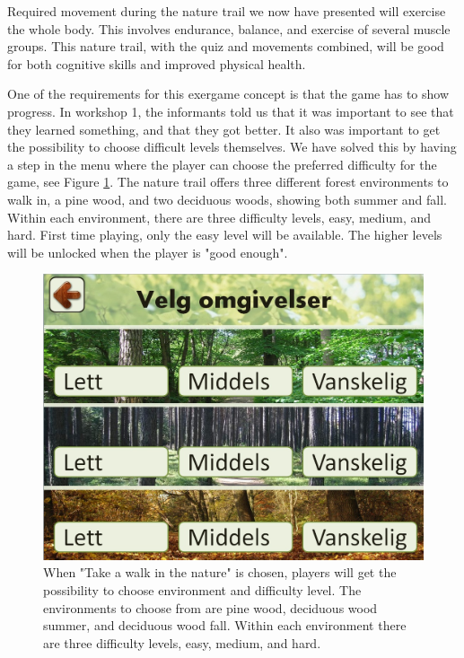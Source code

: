 Required movement during the nature trail we now have presented will exercise the whole body. This involves endurance, balance, and exercise of several muscle groups. This nature trail, with the quiz and movements combined, will be good for both cognitive skills and improved physical health.  

One of the requirements for this exergame concept is that the game has to show progress. In workshop 1, the informants told us that it was important to see that they learned something, and that they got better. It also was important to get the possibility to choose difficult levels themselves. We have solved this by having a step in the menu where the player can choose the preferred difficulty for the game, see Figure \ref{fig:omgivelseNivaa}. The nature trail offers three different forest environments to walk in, a pine wood, and two deciduous woods, showing both summer and fall. Within each environment, there are three difficulty levels, easy, medium, and hard. First time playing, only the easy level will be available. The higher levels will be unlocked when the player is "good enough".   

\begin{figure} [H]
\centering
\includegraphics[scale=0.45]{VelgOmgivelser.jpg}
\caption[Choice of surroundings and difficulty]{When "Take a walk in the nature" is chosen, players will get the possibility to choose environment and difficulty level. The environments to choose from are pine wood, deciduous wood summer, and deciduous wood fall. Within each environment there are three difficulty levels, easy, medium, and hard.}
\label{fig:omgivelseNivaa}
\end{figure}
     

